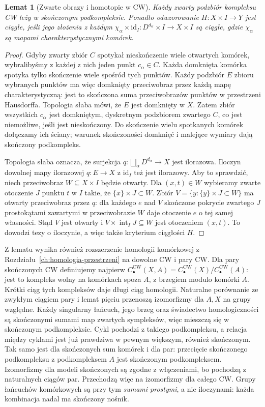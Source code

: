 \documentclass[11pt,a4paper,oneside]{report}
\newcommand{\id}{\mathrm{id}}
\theoremstyle{plain}
\newtheorem{lemat}[twierdzenie]{Lemat}
\theoremstyle{definition}
\theoremstyle{remark}
\begin{document}
\begin{lemat}[Zwarte obrazy i homotopie w CW]
\label{lem:zwartosc-cw-pi}
Każdy zwarty podzbiór kompleksu CW leży w skończonym podkompleksie.
Ponadto odwzorowanie $H:X\times I\to Y$ jest ciągłe, jeśli jego złożenia
z każdym $\chi_\alpha\times\id_I:D^{d_\alpha}\times I\to X\times I$
są ciągłe, gdzie $\chi_\alpha$ są mapami charakterystycznymi komórek.
\end{lemat}
\begin{proof}
Gdyby zwarty zbiór $C$ spotykał nieskończenie wiele otwartych komórek,
wybralibyśmy z każdej z nich jeden punkt $c_\alpha\in C$.
Każda domknięta komórka spotyka tylko skończenie wiele spośród tych punktów.
Każdy podzbiór $E$ zbioru wybranych punktów ma więc domknięty
przeciwobraz przez każdą mapę charakterystyczną: jest to skończona
suma przeciwobrazów punktów w przestrzeni Hausdorffa.
Topologia słaba mówi, że $E$ jest domknięty w $X$.
Zatem zbiór wszystkich $c_\alpha$ jest domkniętym, dyskretnym
podzbiorem zwartego $C$, co jest niemożliwe, jeśli jest nieskończony.
Do skończenie wielu spotkanych komórek dołączamy ich ściany;
warunek skończoności domknięć i malejące wymiary dają skończony podkompleks.

Topologia słaba oznacza, że surjekcja
$q:\bigsqcup_\alpha D^{d_\alpha}\to X$ jest ilorazowa.
Iloczyn dowolnej mapy ilorazowej $q:E\to X$ z $\id_I$ też jest ilorazowy.
Aby to sprawdzić, niech przeciwobraz $W\subseteq X\times I$ będzie otwarty.
Dla $(x,t)\in W$ wybieramy zwarte otoczenie $J$ punktu $t$ w $I$
takie, że $\{x\}\times J\subset W$. Zbiór
$V=\{y:\{y\}\times J\subset W\}$ ma otwarty przeciwobraz przez $q$:
dla każdego $e$ nad $V$ skończone pokrycie zwartego $J$
prostokątami zawartymi w przeciwobrazie $W$ daje otoczenie $e$
o tej samej własności. Stąd $V$ jest otwarty i
$V\times\operatorname{int}_I J\subseteq W$ jest otoczeniem $(x,t)$.
To dowodzi tezy o iloczynie, a więc także kryterium ciągłości $H$.
\end{proof}

Z lematu wynika również rozszerzenie homologii komórkowej
z Rozdziału~\ref{ch:homologia-przestrzeni} na dowolne CW i pary CW.
Dla pary skończonych CW definiujemy najpierw
$C_\bullet^{\mathrm{CW}}(X,A)=C_\bullet^{\mathrm{CW}}(X)/C_\bullet^{\mathrm{CW}}(A)$:
jest to kompleks wolny na komórkach spoza $A$, z brzegiem modulo komórki $A$.
Krótki ciąg tych kompleksów daje długi ciąg homologii.
Naturalne porównanie ze zwykłym ciągiem pary i lemat pięciu
przenoszą izomorfizmy dla $A,X$ na grupy względne.
Każdy singularny łańcuch, jego brzeg oraz świadectwo homologiczności
są skończonymi sumami map zwartych sympleksów, więc mieszczą się
w skończonym podkompleksie. Cykl pochodzi z takiego podkompleksu,
a relacja między cyklami jest już prawdziwa w pewnym większym,
również skończonym. Tak samo jest dla skończonych sum komórek
i dla par: przecięcie skończonego podkompleksu z podkompleksem $A$
jest skończonym podkompleksem. Izomorfizmy dla modeli skończonych
są zgodne z włączeniami, bo pochodzą z naturalnych ciągów par.
Przechodzą więc na izomorfizmy dla całego CW.
Grupy łańcuchów komórkowych są przy tym \emph{sumami prostymi},
a nie iloczynami: każda kombinacja nadal ma skończony nośnik.
\end{document}
